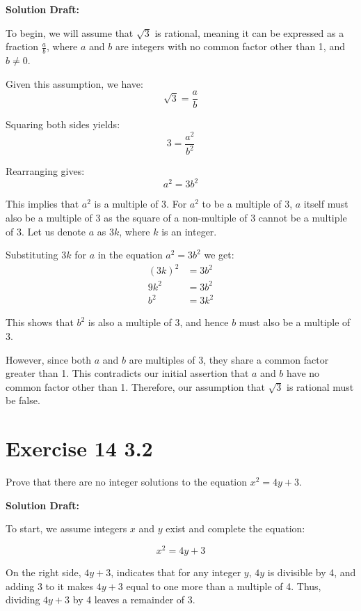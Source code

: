 \documentclass{article}
\begin{document}
\vspace{0.5cm}
\noindent\textbf{Solution Draft:} 
\vspace{0.2cm}

To begin, we will assume that \(\sqrt{3}\) is rational, meaning it can be expressed as a fraction \(\frac{a}{b}\), where \(a\) and \(b\) are integers with no common factor other than 1, and \(b \neq 0\).

Given this assumption, we have:
\[\sqrt{3} = \frac{a}{b}\]

Squaring both sides yields:
\[3 = \frac{a^2}{b^2}\]

Rearranging gives:
\[a^2 = 3b^2\]

This implies that \(a^2\) is a multiple of 3. For \(a^2\) to be a multiple of 3, \(a\) itself must also be a multiple of 3 as the square of a non-multiple of 3 cannot be a multiple of 3. Let us denote \(a\) as \(3k\), where \(k\) is an integer.

Substituting \(3k\) for \(a\) in the equation \(a^2 = 3b^2\) we get:
\begin{align*}
    (3k)^2 &= 3b^2 \\
    9k^2 &= 3b^2 \\
    b^2 &= 3k^2
    \end{align*}
    

This shows that \(b^2\) is also a multiple of 3, and hence \(b\) must also be a multiple of 3.

However, since both \(a\) and \(b\) are multiples of 3, they share a common factor greater than 1. This contradicts our initial assertion that \(a\) and \(b\) have no common factor other than 1. Therefore, our assumption that \(\sqrt{3}\) is rational must be false.


\section*{Exercise 14 3.2}  

Prove that there are no integer solutions to the equation \(x^2 = 4y + 3\).


\vspace{0.5cm}
\noindent\textbf{Solution Draft:} 
\vspace{0.2cm}

To start, we assume integers $x$ and $y$ exist and complete the equation:

\[x^2 = 4y + 3\]

On the right side, $4y + 3$, indicates that for any integer $y$, $4y$ is divisible by 4, and adding 3 to it makes $4y + 3$ equal to one more than a multiple of 4. Thus, dividing $4y + 3$ by 4 leaves a remainder of 3.
\end{document}
